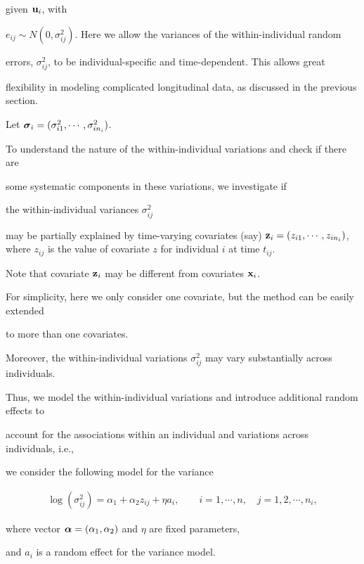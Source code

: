 \documentclass[12pt]{article}
\newcommand{\balpha}{\mbox{\boldmath $\alpha$}}
\newcommand{\bsigma}{\mbox{\boldmath $\sigma$}}
\begin{document}
given ${\bf u}_i$, with 

$ e_{ij} \sim N(0, \sigma_{ij}^2)$. Here we allow the variances of the within-individual random 

errors, $\sigma^2_{ij}$, to be individual-specific and time-dependent. This allows great 

flexibility in modeling complicated longitudinal data, as discussed in the previous section. 

Let $\bsigma_i = (\sigma_{i1}^2, \cdots, \sigma_{in_i}^2)$. 



   To understand the nature of the within-individual variations and check if there are 

some systematic components in these variations, we investigate if 

the within-individual variances $\sigma^2_{ij}$ 

may be partially explained by time-varying covariates (say) ${\bf z}_i = (z_{i1}, \cdots, 

z_{in_i})$, where $z_{ij}$ is the value of covariate $z$ for individual $i$ at time $t_{ij}$. 

 Note that covariate ${\bf z}_i$ may be different from covariates ${\bf x}_i$. 

For simplicity, here we only consider one covariate, but the method can be easily extended 

to more than one covariates. 

Moreover, the within-individual variations $\sigma^2_{ij}$ may vary substantially across individuals. 

Thus, we model the within-individual variations and introduce additional random effects to 

account for the associations within an individual and variations across individuals, i.e., 

we consider the following model for the variance 

\begin{eqnarray}

     \log(\sigma_{ij}^2) = \alpha_1 + \alpha_2 z_{ij} + \eta a_i,  

   \qquad i=1,\cdots,n,  \quad j=1,2,\cdots, n_i, \label{var_model}

\end{eqnarray}

where vector $\balpha=(\alpha_1, \alpha_2)$ and $\eta$ are fixed parameters, 

and $a_i$ is a random effect for the variance model. 
\end{document}
